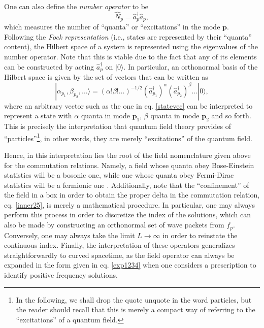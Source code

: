 \documentclass[
12pt,		%
openright,	%
twoside,  %
a4paper,			%
chapter=TITLE,		%
english,			%
french,				%
spanish,			%
brazil				%
]{USPSC-classe/USPSC}
\begin{document}
One can also define the \textit{number operator} to be
\begin{equation}
    \hat{N}_p=\hat{a}_p^{\dag}\hat{a}_p,
\end{equation}
which measures the number of ``quanta'' or ``excitations'' in the mode $\textbf{p}$. Following the \textit{Fock representation} (i.e., states are represented by their ``quanta'' content), the Hilbert space of a system is represented using the eigenvalues of the number operator. Note that this is viable due to the fact that any of its elements can be constructed by acting $\hat{a}_p^{\dag}$ on $|0\rangle$. In particular, an orthonormal basis of the Hilbert space is given by the set of vectors that can be written as
\begin{equation}\label{statevec}
    |\alpha_{p_1},\beta_{p_2},\ldots\rangle=(\alpha!\beta!\ldots)^{-1/2}(\hat{a}^{\dag}_{p_1})^{\alpha}(\hat{a}^{\dag}_{p_2})^{\beta}\ldots|0\rangle,
\end{equation}
where an arbitrary vector such as the one in eq. \ref{statevec} can be interpreted to represent a state with $\alpha$ quanta in mode $\textbf{p}_1$, $\beta$ quanta in mode $\textbf{p}_2$ and so forth. This is precisely the interpretation that quantum field theory provides of ``particles''\footnote{In the following, we shall drop the quote unquote in the word particles, but the reader should recall that this is merely a compact way of referring to the ``excitations'' of a quantum field.}, in other words, they are merely ``excitations'' of the quantum field. 

Hence, in this interpretation lies the root of the field nomenclature given above for the commutation relations. Namely, a field whose quanta obey Bose-Einstein statistics \cite{Sakurai1994} will be a bosonic one, while one whose quanta obey Fermi-Dirac statistics will be a fermionic one \cite{Parker2009}. Additionally, note that the ``confinement'' of the field in a box in order to obtain the proper delta in the commutation relation, eq. \ref{inner25}, is merely a mathematical procedure. In particular, one may always perform this process in order to discretize the index of the solutions, which can also be made by constructing an orthonormal set of wave packets from $f_p$. Conversely, one may always take the limit $L\to\infty$ in order to reinstate the continuous index. Finally, the interpretation of these operators generalizes straightforwardly to curved spacetime, as the field operator can always be expanded in the form given in eq. \ref{exp1234} when one considers a prescription to identify positive frequency solutions.
\end{document}
